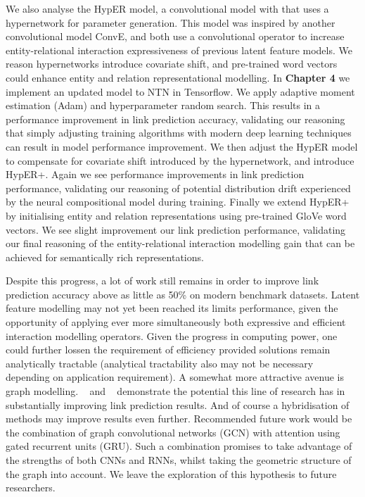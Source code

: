 We also analyse the HypER model, a convolutional model with that uses a hypernetwork for parameter generation. This model was inspired by another convolutional model ConvE, and both use a convolutional operator to increase entity-relational interaction expressiveness of previous latent feature models. We reason hypernetworks introduce covariate shift, and pre-trained word vectors could enhance entity and relation representational modelling. \newline
In \textbf{Chapter 4} we implement an updated model to NTN in Tensorflow. We apply adaptive moment estimation (Adam) and hyperparameter random search. This results in a performance improvement in link prediction accuracy, validating our reasoning that simply adjusting training algorithms with modern deep learning techniques can result in model performance improvement. We then adjust the HypER model to compensate for covariate shift introduced by the hypernetwork, and introduce HypER+. Again we see performance improvements in link prediction performance, validating our reasoning of potential distribution drift experienced by the neural compositional model during training. Finally we extend HypER+ by initialising entity and relation representations using pre-trained GloVe word vectors. We see slight improvement our link prediction performance, validating our final reasoning of the entity-relational interaction modelling gain that can be achieved for semantically rich representations. \bigskip

Despite this progress, a lot of work still remains in order to improve link prediction accuracy above as little as 50\% on modern benchmark datasets. Latent feature modelling may not yet been reached its limits performance, given the opportunity of applying ever more simultaneously both expressive and efficient interaction modelling operators. Given the progress in computing power, one could further lossen the requirement of efficiency provided solutions remain analytically tractable (analytical tractability also may not be necessary depending on application requirement).\newline
A somewhat more attractive avenue is graph modelling.  ~\citep{nathani2019learning} and ~\citep{pinter-eisenstein-2018-predicting} demonstrate the potential this line of research has in substantially improving link prediction results. And of course a hybridisation of methods may improve results even further. Recommended future work would be the combination of graph convolutional networks (GCN) with attention using gated recurrent units (GRU). Such a combination promises to take advantage of the strengths of both CNNs and RNNs, whilst taking the geometric structure of the graph into account. We leave the exploration of this hypothesis to future researchers.
